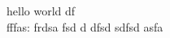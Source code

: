 \documentclass{article}
\begin{document}
	hello world df \textbf{\gitRel}\\
	fffas:\gitRoff
	\newpage
	frdsa fsd d dfsd sdfsd
	\newpage
	asfa
\end{document}
